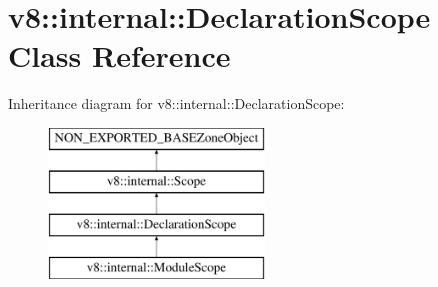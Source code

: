 \hypertarget{classv8_1_1internal_1_1DeclarationScope}{}\section{v8\+:\+:internal\+:\+:Declaration\+Scope Class Reference}
\label{classv8_1_1internal_1_1DeclarationScope}
Inheritance diagram for v8\+:\+:internal\+:\+:Declaration\+Scope\+:\begin{figure}[H]
\begin{center}
\leavevmode
\includegraphics[height=4.000000cm]{classv8_1_1internal_1_1DeclarationScope}
\end{center}
\end{figure}
